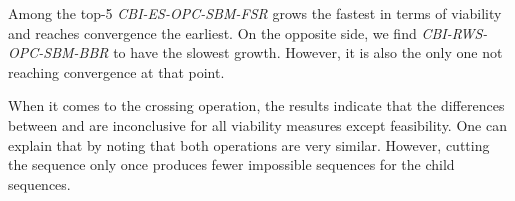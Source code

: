 \documentclass[./../../paper.tex]{subfiles}
\begin{document}
Among the top-5 \emph{CBI-ES-OPC-SBM-FSR} grows the fastest in terms of viability and reaches convergence the earliest. On the opposite side, we find \emph{CBI-RWS-OPC-SBM-BBR} to have the slowest growth. However, it is also the only one not reaching convergence at that point.  

When it comes to the crossing operation, the results indicate that the differences between  and  are inconclusive for all viability measures except feasibility. One can explain that by noting that both operations are very similar. However, cutting the sequence only once produces fewer impossible sequences for the child sequences.
\end{document}
